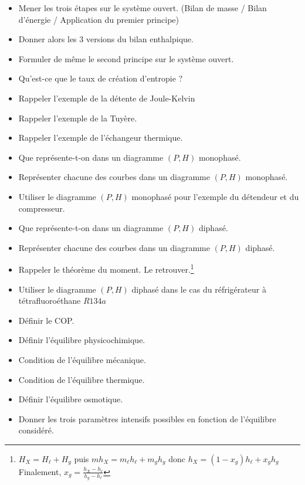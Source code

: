 \documentclass[a4paper, 11pt, hidelinks]{article}
\begin{document}
\begin{itemize}
    \item Mener les trois étapes sur le système ouvert. (Bilan de masse / Bilan d'énergie / Application du premier principe) \cite{Chapitre19}
    \item Donner alors les 3 versions du bilan enthalpique. \cite{Chapitre19}
    \item Formuler de même le second principe sur le système ouvert. \cite{Chapitre19}
    \item Qu'est-ce que le taux de création d'entropie ? \cite{Chapitre19}
    \item Rappeler l'exemple de la détente de Joule-Kelvin
    \item Rappeler l'exemple de la Tuyère. \cite{Chapitre19}
    \item Rappeler l'exemple de l'échangeur thermique. \cite{Chapitre19}
    \item Que représente-t-on dans un diagramme $(P,H)$ monophasé. \cite{Chapitre19}
    \item Représenter chacune des courbes dans un diagramme $(P,H)$ monophasé. \cite{Chapitre19}
    \item Utiliser le diagramme $(P,H)$ monophasé pour l'exemple du détendeur et du compresseur. \cite{Chapitre19}
    \item Que représente-t-on dans un diagramme $(P,H)$ diphasé. \cite{Chapitre19}
    \item Représenter chacune des courbes dans un diagramme $(P,H)$ diphasé. \cite{Chapitre19}
    \item Rappeler le théorème du moment. Le retrouver.\footnote{$H_X=H_\ell + H_g$ puis $mh_X=m_\ell h_\ell + m_g h_g$ donc $h_X=(1-x_g)h_\ell + x_g h_g$ Finalement, $x_g = \frac{h_X-h_\ell}{h_g-h_\ell}$} \cite{Chapitre19}
    \item Utiliser le diagramme $(P,H)$ diphasé dans le cas du réfrigérateur à tétrafluoroéthane $R134a$ \cite{Chapitre19}
    \item Définir le COP. \cite{Chapitre19}
    \item Définir l'équilibre physicochimique. \cite{Chapitre1bis}
    \item Condition de l'équilibre mécanique. \cite{Chapitre1bis}
    \item Condition de l'équilibre thermique. \cite{Chapitre1bis}
    \item Définir l'équilibre osmotique. \cite{Chapitre1bis}
    \item Donner les trois paramètres intensifs possibles en fonction de l'équilibre considéré. \cite{Chapitre1bis}

\end{itemize}
\end{document}
